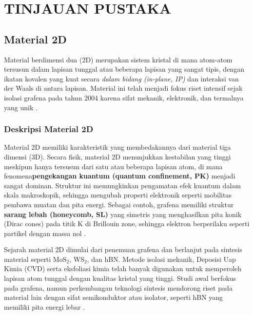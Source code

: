 \renewcommand{\thechapter}{\Roman{chapter}}
\chapter{TINJAUAN PUSTAKA}
\renewcommand{\thechapter}{\arabic{chapter}}


\section{Material 2D}
Material berdimensi dua (2D) merupakan sistem kristal di mana atom-atom tersusun dalam lapisan tunggal atau beberapa lapisan yang sangat tipis, dengan ikatan kovalen yang kuat secara \emph{dalam bidang (in-plane, IP)} dan interaksi van der Waals di antara lapisan. Material ini telah menjadi fokus riset intensif sejak isolasi grafena pada tahun 2004 karena sifat mekanik, elektronik, dan termalnya yang unik \citep{novoselov_electric_2004,geim_rise_2007}.

\subsection{Deskripsi Material 2D}
Material 2D memiliki karakteristik yang membedakannya dari material tiga dimensi (3D). Secara fisik, material 2D menunjukkan kestabilan yang tinggi meskipun hanya tersusun dari satu atau beberapa lapisan atom, di mana fenomena\textbf{pengekangan kuantum (quantum confinement, PK)} menjadi sangat dominan. Struktur ini memungkinkan pengamatan efek kuantum dalam skala makroskopik, sehingga mengubah properti elektronik seperti mobilitas pembawa muatan dan pita energi. Sebagai contoh, grafena memiliki struktur \textbf{sarang lebah (honeycomb, SL)} yang simetris yang menghasilkan pita konik (Dirac cones) pada titik K di Brillouin zone, sehingga elektron berperilaku seperti partikel dengan massa nol \citep{castro_neto_electronic_2009}.  
 
Sejarah material 2D dimulai dari penemuan grafena dan berlanjut pada sintesis material seperti MoS\(_2\), WS\(_2\), dan hBN. Metode isolasi mekanik, Deposisi Uap Kimia (CVD) serta eksfoliasi kimia telah banyak digunakan untuk memperoleh lapisan atom tunggal dengan kualitas kristal yang tinggi. Studi awal berfokus pada grafena, namun perkembangan teknologi sintesis mendorong riset pada material lain dengan sifat semikonduktor atau isolator, seperti hBN yang memiliki pita energi lebar \citep{geim_van_2013}.

